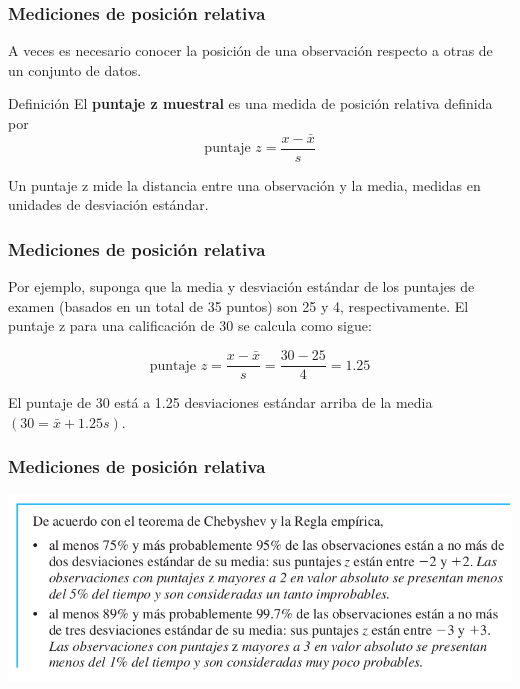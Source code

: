 \documentclass[spanish]{beamer}
\begin{document}
\begin{frame}
\frametitle{Mediciones de posición relativa }
A veces es necesario conocer la posición de una observación respecto a otras de un conjunto de datos.

\begin{block}{Definición}
El \textbf{puntaje z muestral} es una medida de posición relativa definida
por
\begin{equation*}
\text{puntaje } z = \frac{x-\bar{x}}{s}
\end{equation*}
\end{block}

Un puntaje z mide la distancia entre una observación y la media, medidas en unidades de desviación estándar.

\end{frame}
\begin{frame}
\frametitle{Mediciones de posición relativa }
Por ejemplo, suponga que la media y desviación estándar de los puntajes de examen (basados en un total de 35 puntos) son 25 y 4, respectivamente. El puntaje z para una calificación de 30 se calcula como sigue:

\begin{equation*}
\text{puntaje } z = \frac{x-\bar{x}}{s}=\frac{30-25}{4}=1.25
\end{equation*}

El puntaje de 30 está a 1.25 desviaciones estándar arriba de la media $(30 = \bar{x}+1.25s)$.
\end{frame}
\begin{frame}
\frametitle{Mediciones de posición relativa }
\begin{center}
\includegraphics[scale=0.4]{im24}
\end{center}
\end{frame}
\end{document}
